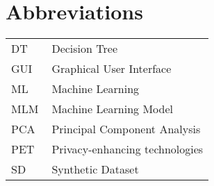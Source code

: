 \chapter*{Abbreviations}


\begin{flushleft}
\begin{tabular}{l p{0.8\linewidth}}
DT & Decision Tree\\
GUI & Graphical User Interface\\
ML  & Machine Learning\\
MLM & Machine Learning Model\\
PCA & Principal Component Analysis\\
PET & Privacy-enhancing technologies\\
SD & Synthetic Dataset\\
\end{tabular}
\end{flushleft}